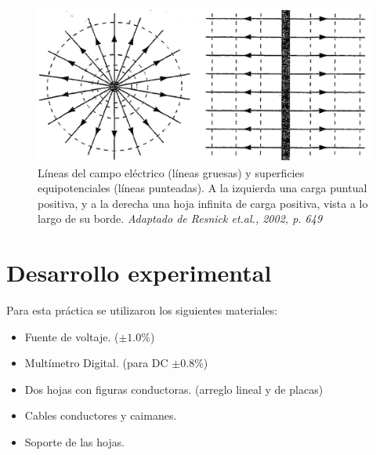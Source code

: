 \documentclass[letterpaper, 11 pt]{article}
\begin{document}
\begin{multicols}{2}
 \begin{figure}[H]
\includegraphics[scale=0.17
]{equi.jpeg}
\centering
    \captionsetup{justification=centering,margin=0.5cm}
\caption{Líneas del campo eléctrico (líneas gruesas) y superficies equipotenciales (líneas punteadas). A la izquierda una carga puntual positiva, y a la derecha una hoja infinita de carga positiva, vista a lo largo de su borde. \textit{Adaptado de Resnick et.al., 2002, p. 649}}
\label{seq}
\end{figure}

\section{Desarrollo experimental}
Para esta práctica se utilizaron los siguientes materiales:

\begin{itemize}
    \item Fuente de voltaje. ($\pm 1.0\%$)
    \item Multímetro Digital. (para DC $\pm 0.8\%$)
    \item Dos hojas con figuras conductoras. (arreglo lineal y de placas)
    \item Cables conductores y caimanes.
    \item Soporte de las hojas.
\end{itemize}{}




\end{multicols}
\end{document}
